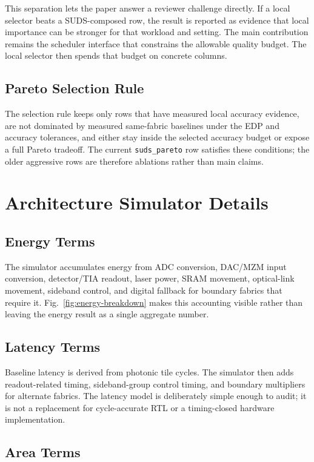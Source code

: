 \documentclass[10pt,journal]{IEEEtran}
\begin{document}
This separation lets the paper answer a reviewer challenge directly. If a local
selector beats a SUDS-composed row, the result is reported as evidence that
local importance can be stronger for that workload and setting. The main
contribution remains the scheduler interface that constrains the allowable
quality budget. The local selector then spends that budget on concrete columns.

\subsection{Pareto Selection Rule}

The selection rule keeps only rows that have measured local accuracy evidence,
are not dominated by measured same-fabric baselines under the EDP and accuracy
tolerances, and either stay inside the selected accuracy budget or expose a full
Pareto tradeoff. The current \texttt{suds\_pareto} row satisfies these
conditions; the older aggressive rows are therefore ablations rather than main
claims.

\section{Architecture Simulator Details}

\subsection{Energy Terms}

The simulator accumulates energy from ADC conversion, DAC/MZM input conversion,
detector/TIA readout, laser power, SRAM movement, optical-link movement,
sideband control, and digital fallback for boundary fabrics that require it.
Fig.~\ref{fig:energy-breakdown} makes this accounting visible rather than
leaving the energy result as a single aggregate number.

\subsection{Latency Terms}

Baseline latency is derived from photonic tile cycles. The simulator then adds
readout-related timing, sideband-group control timing, and boundary multipliers
for alternate fabrics. The latency model is deliberately simple enough to audit;
it is not a replacement for cycle-accurate RTL or a timing-closed hardware
implementation.

\subsection{Area Terms}
\end{document}
